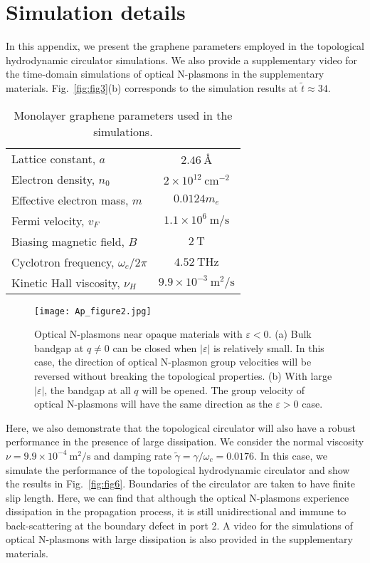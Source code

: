 \documentclass[%
reprint,
amsmath,amssymb,
aps,superscriptaddress
]{revtex4-2}
\begin{document}
\section{Simulation details}\label{simulaton_details}
In this appendix, we present the graphene parameters employed in the topological hydrodynamic circulator simulations. We also provide a supplementary video for the time-domain simulations of optical N-plasmons in the supplementary materials. Fig.~\ref{fig:fig3}(b) corresponds to the simulation results at $\tilde{t}\approx 34$.

\begin{table}[h]
\caption{\label{tab:table1} Monolayer graphene parameters used in the simulations.}
\begin{tabularx}{\linewidth}{Xc}
\hline
Lattice constant, $a$ & $2.46~\si{\angstrom}$ \\
Electron density, $n_0$          & $2\times10^{12}~\mathrm{cm}^{-2}$   \\
Effective electron mass, $m$ & $ 0.0124m_e $ \\
Fermi velocity, $v_F$            & $1.1\times10^6~\mathrm{m/s}$                 \\

Biasing magnetic field, $B$     & $2~\mathrm{T}$                      \\

Cyclotron frequency, $\omega_c/2\pi$  & $4.52~\mathrm{THz}$ \\
Kinetic Hall viscosity, $\nu_H$         & $9.9\times 10^{-3}~\mathrm{m^2/s}$ \\
\hline
\end{tabularx}
\end{table}

\begin{figure}[t]
    \centering
    \texttt{[image: Ap\_figure2.jpg]}
    \caption{Optical N-plasmons near opaque materials with $\varepsilon < 0$. (a) Bulk bandgap at $q \neq 0$ can be closed when $|\varepsilon|$ is relatively small. In this case, the direction of optical N-plasmon group velocities will be reversed without breaking the topological properties. (b) With large $|\varepsilon|$, the bandgap at all $q$ will be opened. The group velocity of optical N-plasmons will have the same direction as the $\varepsilon>0$ case.}
    \label{fig:fig5}
\end{figure}

Here, we also demonstrate that the topological circulator will also have a robust performance in the presence of large dissipation. We consider the normal viscosity $\nu=9.9\times 10^{-4}~\mathrm{m^2/s}$ and damping rate $\tilde{\gamma}=\gamma / \omega_c = 0.0176$. In this case, we simulate the performance of the topological hydrodynamic circulator and show the results in Fig.~\ref{fig:fig6}. Boundaries of the circulator are taken to have finite slip length. Here, we can find that although the optical N-plasmons experience dissipation in the propagation process, it is still unidirectional and immune to back-scattering at the boundary defect in port 2. A video for the simulations of optical N-plasmons with large dissipation is also provided in the supplementary materials.
\end{document}
